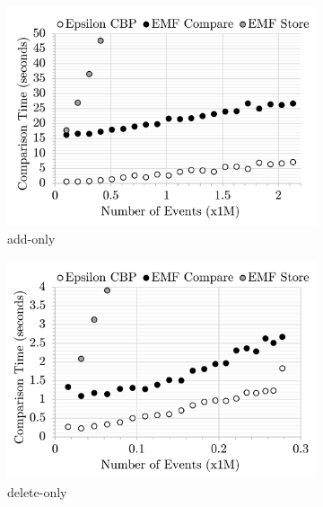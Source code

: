 \begin{figure}[ht]
    \centering
    \begin{subfigure}[t]{0.245\linewidth}
        \includegraphics[width=\linewidth]{add-conflict-time-events}
        \caption{add-only}
        \label{fig:add-conflict-time-events}
    \end{subfigure}
    \hfill
    \begin{subfigure}[t]{0.245\linewidth}
        \includegraphics[width=\linewidth]{delete-conflict-time-events}
        \caption{delete-only}
        \label{fig:delete-conflict-time-events}
    \end{subfigure}
    \hfill
    \begin{subfigure}[t]{0.245\linewidth}

\end{subfigure}
\end{figure}
